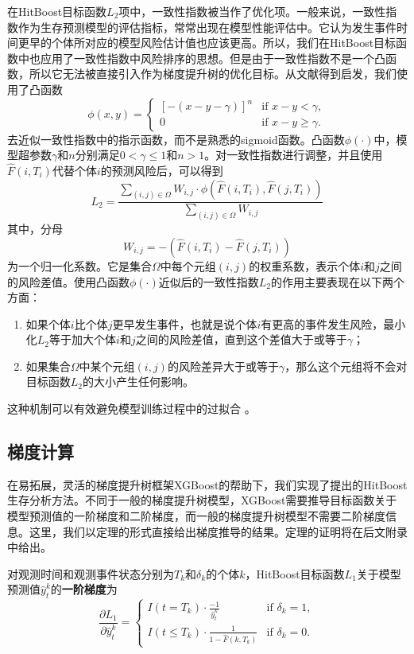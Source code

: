 在HitBoost目标函数$L_2$项中，一致性指数被当作了优化项。一般来说，一致性指数作为生存预测模型的评估指标，常常出现在模型性能评估中。它认为发生事件时间更早的个体所对应的模型风险估计值也应该更高。所以，我们在HitBoost目标函数中也应用了一致性指数中风险排序的思想。但是由于一致性指数不是一个凸函数，所以它无法被直接引入作为梯度提升树的优化目标。从文献\cite{Yan2004pre}得到启发，我们使用了凸函数$$
\phi(x,y)=
\begin{cases}
{[-(x-y-\gamma)]}^n & \text{if } x-y < \gamma,\\
0 & \text{if } x-y \ge \gamma.
\end{cases}
$$
去近似一致性指数中的指示函数，而不是熟悉的sigmoid函数。凸函数$\phi(\cdot)$中，模型超参数$\gamma$和$n$分别满足$0<\gamma \le 1$和$n>1$。对一致性指数进行调整，并且使用$\hat{F}(i, T_i)$代替个体$i$的预测风险后，可以得到$$
L_2 = \frac{\sum_{(i,j)\in \Omega} W_{i,j}\cdot \phi(\hat{F}(i, T_i), \hat{F}(j, T_i))}{\sum_{(i,j)\in \Omega} W_{i,j}}
$$
其中，分母$$
W_{i,j}=-\left( \hat{F}(i, T_i) - \hat{F}(j, T_i) \right)
$$
为一个归一化系数。它是集合$\Omega$中每个元组$(i,j)$的权重系数，表示个体$i$和$j$之间的风险差值。使用凸函数$\phi(\cdot)$近似后的一致性指数$L_2$的作用主要表现在以下两个方面：
\begin{enumerate}
    \item 如果个体$i$比个体$j$更早发生事件，也就是说个体$i$有更高的事件发生风险，最小化$L_2$等于加大个体$i$和$j$之间的风险差值，直到这个差值大于或等于$\gamma$；
    \item 如果集合$\Omega$中某个元组$(i,j)$的风险差异大于或等于$\gamma$，那么这个元组将不会对目标函数$L_2$的大小产生任何影响。
\end{enumerate}
这种机制可以有效避免模型训练过程中的过拟合 。

\subsection{梯度计算}

在易拓展，灵活的梯度提升树框架XGBoost的帮助下，我们实现了提出的HitBoost生存分析方法。不同于一般的梯度提升树模型，XGBoost需要推导目标函数关于模型预测值的一阶梯度和二阶梯度，而一般的梯度提升树模型不需要二阶梯度信息。这里，我们以定理的形式直接给出梯度推导的结果。定理的证明将在后文附录中给出。

\begin{theorem}\label{thm:1.1}
对观测时间和观测事件状态分别为$T_k$和$\delta_k$的个体$k$，HitBoost目标函数$L_1$关于模型预测值$\hat{y}_t^k$的\textbf{一阶梯度}为$$
\frac{\partial L_1}{\partial \hat{y}_t^k}=
\begin{cases}
I(t=T_k)\cdot \frac{-1}{\hat{y}_t^k} & \text{if } \delta_k = 1,\\
I(t\le T_k)\cdot \frac{1}{1-\hat{F}(k, T_k)} & \text{if } \delta_k = 0.
\end{cases}
$$
\end{theorem}

